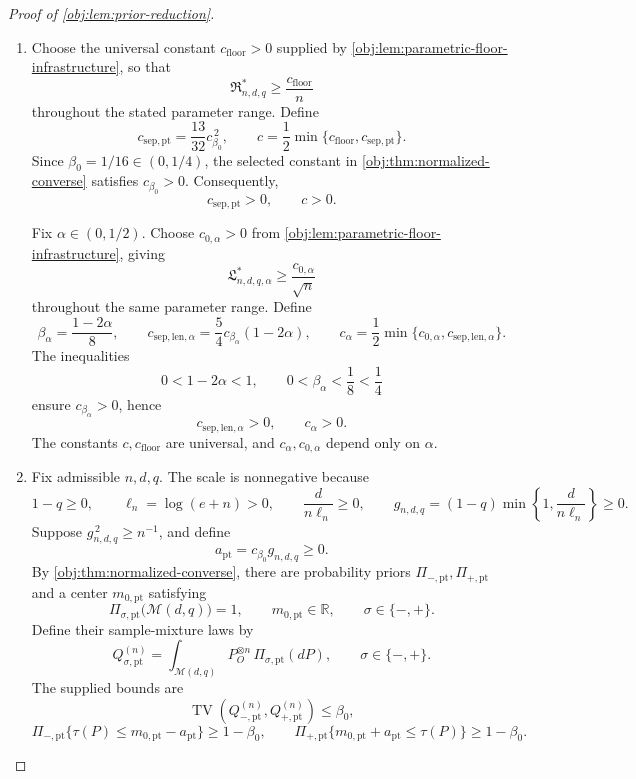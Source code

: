 \documentclass[11pt]{article}
\begin{document}
\begin{proof}[Proof of \cref{obj:lem:prior-reduction}]
\begin{enumerate}
\item Choose the universal constant \(c_{\mathrm{floor}}>0\) supplied by
\cref{obj:lem:parametric-floor-infrastructure}, so that
\[
\mathfrak R^*_{n,d,q}\ge \frac{c_{\mathrm{floor}}}{n}
\]
throughout the stated parameter range. Define
\[
c_{\mathrm{sep,pt}}
=\frac{13}{32}c_{\beta_0}^{\,2},
\qquad
c=\frac12\min\{c_{\mathrm{floor}},c_{\mathrm{sep,pt}}\}.
\]
Since \(\beta_0=1/16\in(0,1/4)\), the selected constant in
\cref{obj:thm:normalized-converse} satisfies \(c_{\beta_0}>0\).
Consequently,
\[
c_{\mathrm{sep,pt}}>0,
\qquad c>0.
\]

Fix \(\alpha\in(0,1/2)\). Choose \(c_{0,\alpha}>0\) from
\cref{obj:lem:parametric-floor-infrastructure}, giving
\[
\mathfrak L^*_{n,d,q,\alpha}
\ge \frac{c_{0,\alpha}}{\sqrt n}
\]
throughout the same parameter range. Define
\[
\beta_\alpha=\frac{1-2\alpha}{8},
\qquad
c_{\mathrm{sep,len},\alpha}
=\frac54c_{\beta_\alpha}(1-2\alpha),
\qquad
c_\alpha
=\frac12\min\{c_{0,\alpha},c_{\mathrm{sep,len},\alpha}\}.
\]
The inequalities
\[
0<1-2\alpha<1,
\qquad
0<\beta_\alpha<\frac18<\frac14
\]
ensure \(c_{\beta_\alpha}>0\), hence
\[
c_{\mathrm{sep,len},\alpha}>0,
\qquad c_\alpha>0.
\]
The constants \(c,c_{\mathrm{floor}}\) are universal, and \(c_\alpha,c_{0,\alpha}\)
depend only on \(\alpha\).

\item Fix admissible \(n,d,q\). The scale is nonnegative because
\[
1-q\ge0,\qquad
\ell_n=\log(e+n)>0,\qquad
\frac{d}{n\ell_n}\ge0,
\qquad
g_{n,d,q}=(1-q)\min\left\{1,\frac{d}{n\ell_n}\right\}\ge0.
\]
Suppose \(g_{n,d,q}^{\,2}\ge n^{-1}\), and define
\[
a_{\mathrm{pt}}=c_{\beta_0}g_{n,d,q}\ge0.
\]
By \cref{obj:thm:normalized-converse}, there are probability priors
\(\Pi_{-,\mathrm{pt}},\Pi_{+,\mathrm{pt}}\) and a center
\(m_{0,\mathrm{pt}}\) satisfying
\[
\Pi_{\sigma,\mathrm{pt}}\bigl(\mathcal M(d,q)\bigr)=1,
\qquad
m_{0,\mathrm{pt}}\in\mathbb R,
\qquad \sigma\in\{-,+\}.
\]
Define their sample-mixture laws by
\[
Q_{\sigma,\mathrm{pt}}^{(n)}
=\int_{\mathcal M(d,q)}P_O^{\otimes n}\,
  \Pi_{\sigma,\mathrm{pt}}(dP),
\qquad \sigma\in\{-,+\}.
\]
The supplied bounds are
\[
\operatorname{TV}\!\left(
Q_{-,\mathrm{pt}}^{(n)},Q_{+,\mathrm{pt}}^{(n)}
\right)\le\beta_0,
\]
\[
\Pi_{-,\mathrm{pt}}\{\tau(P)\le m_{0,\mathrm{pt}}-a_{\mathrm{pt}}\}
\ge1-\beta_0,
\qquad
\Pi_{+,\mathrm{pt}}\{m_{0,\mathrm{pt}}+a_{\mathrm{pt}}\le\tau(P)\}
\ge1-\beta_0.
\]


\end{enumerate}
\end{proof}
\end{document}
